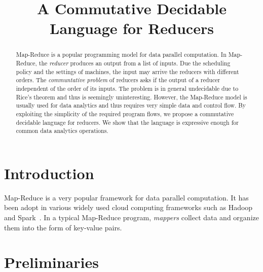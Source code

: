 \documentclass[runningheads,a4paper]{llncs}
\title{A Commutative Decidable Language for Reducers}
\begin{document}
\maketitle

\begin{abstract}

Map-Reduce is a popular programming model for data parallel computation. 
In Map-Reduce, the \emph{reducer} produces an output from a list of inputs. Due the scheduling policy and the settings of machines, the input may arrive the reducers with different orders. The \emph{communtative problem} of reducers asks if the output of a reducer independent of the order of its inputs. The problem is in general undecidable due to Rice's theorem and thus is seemingly uninteresting. However, the Map-Reduce model is usually used for data analytics and thus requires very simple data and control flow. 
By exploiting the simplicity of the required program flows, we propose a commutative decidable language for reducers.
We show that the language is expressive enough for common data analytics operations.
\end{abstract}

\section{Introduction}
Map-Reduce is a very popular framework for data parallel computation. It has been adopt in various widely used cloud computing frameworks such as Hadoop~\cite{Hadoop} and Spark~\cite{Spark}. In a typical Map-Reduce program, \emph{mappers} collect data and organize them into the form of key-value pairs. 




\cite{CHSW15}

\section{Preliminaries}
\end{document}
